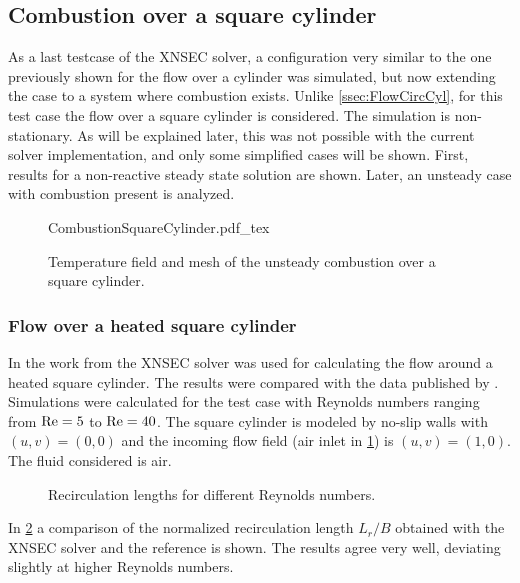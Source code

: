 \FloatBarrier
\subsection{Combustion over a square cylinder}
As a last testcase of the XNSEC solver, a configuration very similar to the one previously shown for the flow over a cylinder was simulated, but now extending the case to a system where combustion exists. 
Unlike \cref{ssec:FlowCircCyl}, for this test case the flow over a square cylinder is considered.  The simulation is non-stationary. As will be explained later, this was not possible with the current solver implementation, and only some simplified cases will be shown.  First, results for a non-reactive steady state solution are shown. Later, an unsteady case with combustion present is analyzed.
\begin{figure}[h]
	\begin{center}
		\def\svgwidth{0.8\textwidth}
		{CombustionSquareCylinder.pdf_tex}
		\caption{Temperature field and mesh of the unsteady combustion over a square cylinder.}
		\label{fig:CombustionSquareCylinder}
	\end{center}
\end{figure}
\subsubsection{Flow over a heated square cylinder}
In the work from \textcite{miaoHighOrderSimulationLowMachFlows2022} the XNSEC solver was used for calculating the flow around a heated square cylinder. The results were compared with the data published by \textcite{sharmaHEATFLUIDFLOW2004}. Simulations were calculated for the test case with Reynolds numbers ranging from $\text{Re} = 5$ to $\text{Re} = 40$. The square cylinder is modeled by no-slip walls with $(u,v) = (0,0)$ and the incoming flow field (air inlet in \cref{fig:CombustionSquareCylinder}) is $(u,v) = (1,0)$. The fluid considered is air. 
\begin{figure}[h!]
	\centering
	\caption{Recirculation lengths for different Reynolds numbers.}
	\label{fig:RecirculationLength}
\end{figure}
In \cref{fig:RecirculationLength} a comparison of the normalized recirculation length $L_r/B$ obtained with the XNSEC solver and the reference is shown. The results agree very well, deviating slightly at higher Reynolds numbers.

